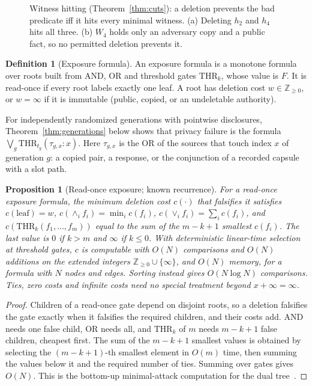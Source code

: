 \documentclass[pdflatex,sn-mathphys-num]{sn-jnl}%
\theoremstyle{plain}
\newtheorem{proposition}[theorem]{Proposition}
\theoremstyle{definition}
\newtheorem{definition}[theorem]{Definition}
\begin{document}
\begin{figure}[t]
\centering
\figbox{}
\caption{Witness hitting (Theorem~\ref{thm:cuts}): a deletion prevents the bad predicate iff it hits every minimal witness. (a) Deleting $h_2$ and $h_4$ hits all three. (b) $W_4$ holds only an adversary copy and a public fact, so no permitted deletion prevents it.}\label{fig:witness}
\end{figure}

\begin{definition}[Exposure formula]
An exposure formula is a monotone formula over roots built from AND, OR and threshold gates $\mathrm{THR}_k$, whose value is $F$. It is read-once if every root labels exactly one leaf. A root has deletion cost $w\in\mathbb{Z}_{\ge0}$, or $w=\infty$ if it is immutable (public, copied, or an undeletable authority).
\end{definition}

For independently randomized generations with pointwise disclosures, Theorem~\ref{thm:generations} below shows that privacy failure is the formula $\bigvee_g\mathrm{THR}_{t_g}(\tau_{g,x}:x)$. Here $\tau_{g,x}$ is the OR of the sources that touch index $x$ of generation $g$: a copied pair, a response, or the conjunction of a recorded capsule with a slot path.

\begin{proposition}[Read-once exposure; known recurrence]\label{prop:readonce}
For a read-once exposure formula, the minimum deletion cost $c(\cdot)$ that falsifies it satisfies $c(\text{leaf})=w$, $c(\wedge_i f_i)=\min_i c(f_i)$, $c(\vee_i f_i)=\sum_i c(f_i)$, and $c(\mathrm{THR}_k(f_1,\dots,f_m))$ equal to the sum of the $m-k+1$ smallest $c(f_i)$. The last value is $0$ if $k>m$ and $\infty$ if $k\le0$. With deterministic linear-time selection~\cite{blum1973} at threshold gates, $c$ is computable with $O(N)$ comparisons and $O(N)$ additions on the extended integers $\mathbb{Z}_{\ge0}\cup\{\infty\}$, and $O(N)$ memory, for a formula with $N$ nodes and edges. Sorting instead gives $O(N\log N)$ comparisons. Ties, zero costs and infinite costs need no special treatment beyond $x+\infty=\infty$.
\end{proposition}
\begin{proof}
Children of a read-once gate depend on disjoint roots, so a deletion falsifies the gate exactly when it falsifies the required children, and their costs add. AND needs one false child, OR needs all, and $\mathrm{THR}_k$ of $m$ needs $m-k+1$ false children, cheapest first. The sum of the $m-k+1$ smallest values is obtained by selecting the $(m-k+1)$-th smallest element in $O(m)$ time, then summing the values below it and the required number of ties. Summing over gates gives $O(N)$. This is the bottom-up minimal-attack computation for the dual tree~\cite{mauw2005,lopuhaa2022}.
\end{proof}
\end{document}
